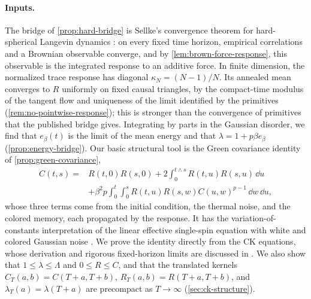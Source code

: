 \paragraph{Inputs.}
The bridge of \cref{prop:hard-bridge} is Sellke's convergence theorem for hard-spherical Langevin dynamics \cite[Theorem~4.3]{sellke2024}: on every fixed time horizon, empirical correlations and a Brownian observable converge, and by \cref{lem:brown-force-response}, this observable is the integrated response to an additive force. In finite dimension, the normalized trace response has diagonal $\kappa_N=(N-1)/N$. Its annealed mean converges to $R$ uniformly on fixed causal triangles, by the compact-time modulus of the tangent flow and uniqueness of the limit identified by the primitives (\cref{rem:no-pointwise-response}); this is stronger than the convergence of primitives that the published bridge gives. Integrating by parts in the Gaussian disorder, we find that $e_\beta(t)$ is the limit of the mean energy and that $\lambda=1+p\beta e_\beta$ (\cref{prop:energy-bridge}). Our basic structural tool is the Green covariance identity of \cref{prop:green-covariance},
\begin{equation}\label{eq:overview-green}
\begin{aligned}
 C(t,s)={}&R(t,0)R(s,0)+2\int_0^{t\wedge s}R(t,u)R(s,u)\,\dd u\\
 &+\beta^2p\int_0^t\int_0^sR(t,u)R(s,w)C(u,w)^{p-1}\,\dd w\,\dd u ,
\end{aligned}
\end{equation}
whose three terms come from the initial condition, the thermal noise, and the colored memory, each propagated by the response. It has the variation-of-constants interpretation of the linear effective single-spin equation with white and colored Gaussian noise \cite[arXiv version~2, Section~9.5, equation~(9.56), p.~55]{cugliandolo2004}. We prove the identity directly from the CK equations, whose derivation and rigorous fixed-horizon limits are discussed in \cite{ck1993,bag2006,ds2020}. We also show that $1\le\lambda\le\Lambda$ and $0\le R\le C$, and that the translated kernels $C_T(a,b)=C(T+a,T+b)$, $R_T(a,b)=R(T+a,T+b)$, and $\lambda_T(a)=\lambda(T+a)$ are precompact as $T\to\infty$ (\cref{sec:ck-structure}).

